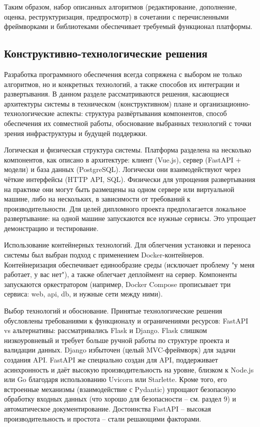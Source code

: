Таким образом, набор описанных алгоритмов (редактирование, дополнение, оценка, реструктуризация, предпросмотр) в сочетании с перечисленными фреймворками и библиотеками обеспечивает требуемый функционал платформы.

\subsection{Конструктивно-технологические решения}
Разработка программного обеспечения всегда сопряжена с выбором не только алгоритмов, но и конкретных технологий, а также способов их интеграции и развертывания. В данном разделе рассматриваются решения, касающиеся архитектуры системы в техническом (конструктивном) плане и организационно-технологические аспекты: структура развёртывания компонентов, способ обеспечения их совместной работы, обоснование выбранных технологий с точки зрения инфраструктуры и будущей поддержки.

\par Логическая и физическая структура системы. Платформа разделена на несколько компонентов, как описано в архитектуре: клиент (Vue.js), сервер (FastAPI + модели) и база данных (PostgreSQL). Логически они взаимодействуют через чёткие интерфейсы (HTTP API, SQL). Физически для упрощения развертывания на практике они могут быть размещены на одном сервере или виртуальной машине, либо на нескольких, в зависимости от требований к производительности.
Для целей дипломного проекта предполагается локальное развертывание: на одной машине запускаются все нужные сервисы. Это упрощает демонстрацию и тестирование.

Использование контейнерных технологий. Для облегчения установки и переноса системы был выбран подход с применением Docker-контейнеров.
Контейнеризация обеспечивает единообразие среды (исключает проблему "у меня работает, у вас нет"), а также облегчает деплоймент на сервер. Компоненты запускаются оркестратором (например, Docker Compose прописывает три сервиса: web, api, db, и нужные сети между ними).

Выбор технологий и обоснование. Принятые технологические решения обусловлены требованиями к функционалу и ограничениями ресурсов:
FastAPI vs альтернативы: рассматривались Flask и Django. Flask слишком низкоуровневый и требует больше ручной работы по структуре проекта и валидации данных. Django избыточен (целый MVC-фреймворк) для задачи создания API. FastAPI же специально создан для API, поддерживает асинхронность и даёт высокую производительность на уровне, близком к Node.js или Go благодаря использованию Uvicorn или Starlette\cite{easyoffer:fastapi}. Кроме того, его встроенные механизмы (взаимодействие с Pydantic) упрощают безопасную обработку входных данных (что хорошо для безопасности – см. раздел 9) и автоматическое документирование. Достоинства FastAPI – высокая производительность и простота – стали решающими факторами\cite{fastapi:practicum}.

